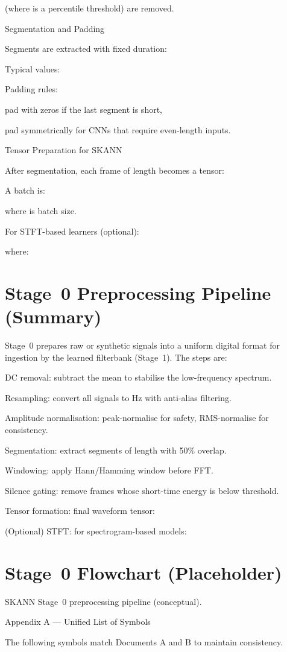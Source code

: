 \documentclass[12pt]{article}
\begin{document}
(where  is a percentile threshold) are removed.

Segmentation and Padding

Segments are extracted with fixed duration:


Typical values:


Padding rules:

pad with zeros if the last segment is short,

pad symmetrically for CNNs that require even-length inputs.

Tensor Preparation for SKANN

After segmentation, each frame of length  becomes a tensor:


A batch is:


where  is batch size.

For STFT-based learners (optional):


where:



\section*{Stage 0 Preprocessing Pipeline (Summary)}
Stage 0 prepares raw or synthetic signals into a uniform digital format for ingestion by the learned filterbank (Stage 1). The steps are:

DC removal: subtract the mean to stabilise the low-frequency spectrum.

Resampling: convert all signals to  Hz with anti-alias filtering.

Amplitude normalisation: peak-normalise for safety, RMS-normalise for consistency.

Segmentation: extract segments of length  with 50\% overlap.

Windowing: apply Hann/Hamming window before FFT.

Silence gating: remove frames whose short-time energy  is below threshold.

Tensor formation: final waveform tensor:


(Optional) STFT: for spectrogram-based models:


\section*{Stage 0 Flowchart (Placeholder)}
SKANN Stage 0 preprocessing pipeline (conceptual).

Appendix A — Unified List of Symbols

The following symbols match Documents A and B to maintain consistency.
\end{document}
